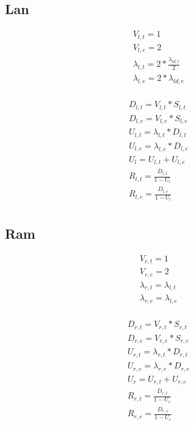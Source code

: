 \documentclass[11pt]{article}
\begin{document}
\subsection{Lan}

\begin{equation}
    \begin{array}{l}
        V_{l, t} = 1 \\
        V_{l, e} = 2 \\ %
        \lambda_{l, t} = 2*\frac{\lambda_{ld, t}}{2} \\ %
        \lambda_{l, e} = 2*\lambda_{ld, e} \\
    \end{array}
\end{equation}

\begin{equation}
    \begin{array}{l}
        D_{l, t} = V_{l, t} * S_{l, t} \\
        D_{l, e} = V_{l, e} * S_{l, e} \\
        U_{l, t} = \lambda_{l, t} * D_{l, t} \\
        U_{l, e} = \lambda_{l, e} * D_{l, e} \\
        U_{l} = U_{l, t} + U_{l, e} \\
        R_{l, t} = \frac{D_{l, t}}{1 - U_{l}} \\
        R_{l, e} = \frac{D_{l, e}}{1 - U_{l}} \\
    \end{array}
\end{equation}

\subsection{Ram}

\begin{equation}
    \begin{array}{l}
        V_{r, t} = 1 \\
        V_{r, e} = 2 \\ %
        \lambda_{r, t} = \lambda_{l, t} \\
        \lambda_{r, e} = \lambda_{l, e} \\
    \end{array}
\end{equation}

\begin{equation}
    \begin{array}{l}
        D_{r, t} = V_{r, t} * S_{r, t} \\
        D_{r, e} = V_{r, e} * S_{r, e} \\
        U_{r, t} = \lambda_{r, t} * D_{r, t} \\
        U_{r, e} = \lambda_{r, e} * D_{r, e} \\
        U_{r} = U_{r, t} + U_{r, e} \\
        R_{r, t} = \frac{D_{r, t}}{1 - U_{r}} \\
        R_{r, e} = \frac{D_{r, e}}{1 - U_{r}} \\
    \end{array}
\end{equation}
\end{document}
